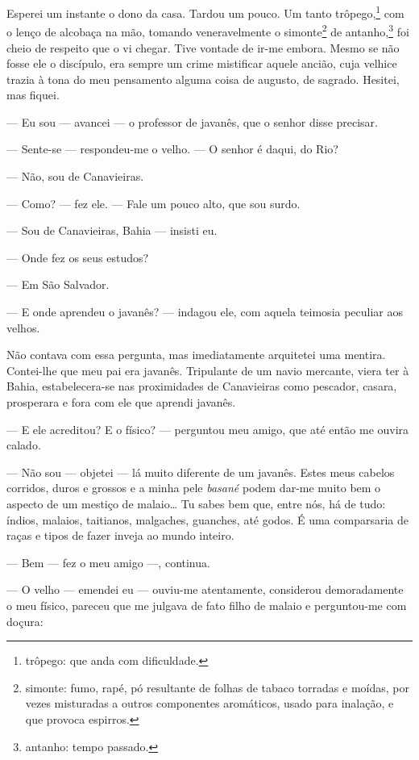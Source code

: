Esperei um instante o dono da casa. Tardou um pouco. Um tanto
trôpego,\footnote{trôpego: que anda com dificuldade.} com o lenço de
alcobaça na mão, tomando veneravelmente o simonte\footnote{simonte:
  fumo, rapé, pó resultante de folhas de tabaco torradas e moídas, por
  vezes misturadas a outros componentes aromáticos, usado para inalação,
  e que provoca espirros.} de antanho,\footnote{antanho: tempo passado.}
foi cheio de respeito que o vi chegar. Tive vontade de ir-me embora.
Mesmo se não fosse ele o discípulo, era sempre um crime mistificar
aquele ancião, cuja velhice trazia à tona do meu pensamento alguma coisa
de augusto, de sagrado. Hesitei, mas fiquei.

--- Eu sou --- avancei --- o professor de javanês, que o senhor disse
precisar.

--- Sente-se --- respondeu-me o velho. --- O senhor é daqui, do Rio?

--- Não, sou de Canavieiras.

--- Como? --- fez ele. --- Fale um pouco alto, que sou surdo.

--- Sou de Canavieiras, Bahia --- insisti eu.

--- Onde fez os seus estudos?

--- Em São Salvador.

--- E onde aprendeu o javanês? --- indagou ele, com aquela teimosia
peculiar aos velhos.

Não contava com essa pergunta, mas imediatamente arquitetei uma mentira.
Contei-lhe que meu pai era javanês. Tripulante de um navio mercante,
viera ter à Bahia, estabelecera-se nas proximidades de Canavieiras como
pescador, casara, prosperara e fora com ele que aprendi javanês.

--- E ele acreditou? E o físico? --- perguntou meu amigo, que até então
me ouvira calado.

--- Não sou --- objetei --- lá muito diferente de um javanês. Estes meus
cabelos corridos, duros e grossos e a minha pele \emph{basané} podem
dar-me muito bem o aspecto de um mestiço de malaio\ldots{} Tu sabes bem
que, entre nós, há de tudo: índios, malaios, taitianos, malgaches,
guanches, até godos. É uma comparsaria de raças e tipos de fazer inveja
ao mundo inteiro.

--- Bem --- fez o meu amigo ---, continua.

--- O velho --- emendei eu --- ouviu-me atentamente, considerou
demoradamente o meu físico, pareceu que me julgava de fato filho de
malaio e perguntou-me com doçura:

